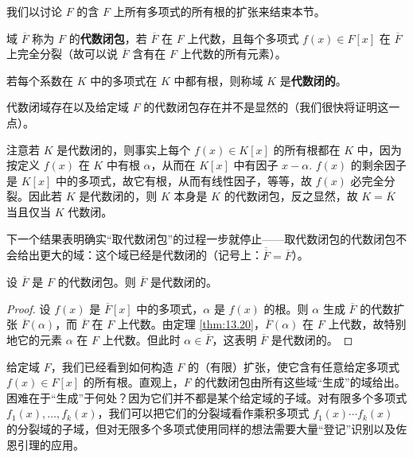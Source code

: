 我们以讨论 \(F\) 的含 \(F\) 上所有多项式的所有根的扩张来结束本节。

\begin{definition}
域 \(\overline{F}\) 称为 \(F\) 的\textbf{代数闭包}，若 \(\overline{F}\) 在 \(F\) 上代数，且每个多项式 \(f(x) \in F[x]\) 在 \(\overline{F}\) 上完全分裂（故可以说 \(\overline{F}\) 含有在 \(F\) 上代数的所有元素）。
\end{definition}

\begin{definition}
若每个系数在 \(K\) 中的多项式在 \(K\) 中都有根，则称域 \(K\) 是\textbf{代数闭的}。
\end{definition}

代数闭域存在以及给定域 \(F\) 的代数闭包存在并不是显然的（我们很快将证明这一点）。

注意若 \(K\) 是代数闭的，则事实上每个 \(f(x) \in K[x]\) 的所有根都在 \(K\) 中，因为按定义 \(f(x)\) 在 \(K\) 中有根 \(\alpha\)，从而在 \(K[x]\) 中有因子 \(x-\alpha\). \(f(x)\) 的剩余因子是 \(K[x]\) 中的多项式，故它有根，从而有线性因子，等等，故 \(f(x)\) 必完全分裂。因此若 \(K\) 是代数闭的，则 \(K\) 本身是 \(K\) 的代数闭包，反之显然，故 \(K = \overline{K}\) 当且仅当 \(K\) 代数闭。

下一个结果表明确实“取代数闭包”的过程一步就停止——取代数闭包的代数闭包不会给出更大的域：这个域已经是代数闭的（记号上：\(\overline{\overline{F}} = \overline{F}\)）。

\begin{proposition}\label{pro:13.29}
设 \(\overline{F}\) 是 \(F\) 的代数闭包。则 \(\overline{F}\) 是代数闭的。
\end{proposition}

\begin{proof}
设 \(f(x)\) 是 \(\overline{F}[x]\) 中的多项式，\(\alpha\) 是 \(f(x)\) 的根。则 \(\alpha\) 生成 \(\overline{F}\) 的代数扩张 \(\overline{F}(\alpha)\)，而 \(\overline{F}\) 在 \(F\) 上代数。由定理 \ref{thm:13.20}，\(\overline{F}(\alpha)\) 在 \(F\) 上代数，故特别地它的元素 \(\alpha\) 在 \(F\) 上代数。但此时 \(\alpha \in \overline{F}\)，这表明 \(\overline{F}\) 是代数闭的。
\end{proof}

给定域 \(F\)，我们已经看到如何构造 \(F\) 的（有限）扩张，使它含有任意给定多项式 \(f(x) \in F[x]\) 的所有根。直观上，\(F\) 的代数闭包由所有这些域“生成”的域给出。困难在于“生成”于何处？因为它们并不都是某个给定域的子域。对有限多个多项式 \(f_1(x), \ldots, f_k(x)\)，我们可以把它们的分裂域看作乘积多项式 \(f_1(x)\cdots f_k(x)\) 的分裂域的子域，但对无限多个多项式使用同样的想法需要大量“登记”识别以及佐恩引理的应用。

